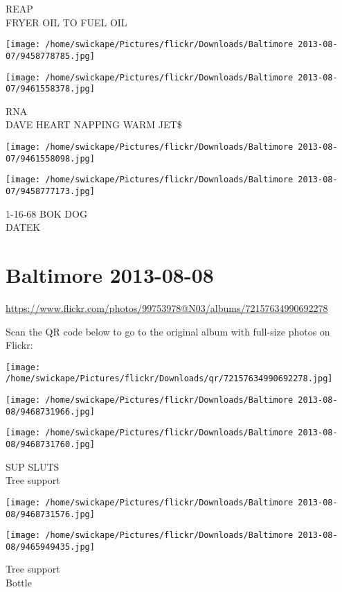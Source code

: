 \documentclass[10pt,letterpaper]{article}
\begin{document}
REAP\\
FRYER OIL TO FUEL OIL
\pagebreak

\texttt{[image: /home/swickape/Pictures/flickr/Downloads/Baltimore 2013-08-07/9458778785.jpg]}

\vspace{0.25in}
\texttt{[image: /home/swickape/Pictures/flickr/Downloads/Baltimore 2013-08-07/9461558378.jpg]}

RNA\\
DAVE HEART NAPPING WARM JET\$
\pagebreak

\texttt{[image: /home/swickape/Pictures/flickr/Downloads/Baltimore 2013-08-07/9461558098.jpg]}

\vspace{0.25in}
\texttt{[image: /home/swickape/Pictures/flickr/Downloads/Baltimore 2013-08-07/9458777173.jpg]}

1{-}16{-}68 BOK DOG\\
DATEK
\pagebreak

\section*{Baltimore 2013-08-08}

\url{https://www.flickr.com/photos/99753978@N03/albums/72157634990692278}

Scan the QR code below to go to the original album with full-size photos on Flickr:

\texttt{[image: /home/swickape/Pictures/flickr/Downloads/qr/72157634990692278.jpg]}
\pagebreak

\texttt{[image: /home/swickape/Pictures/flickr/Downloads/Baltimore 2013-08-08/9468731966.jpg]}

\vspace{0.25in}
\texttt{[image: /home/swickape/Pictures/flickr/Downloads/Baltimore 2013-08-08/9468731760.jpg]}

SUP SLUTS\\
Tree support
\pagebreak

\texttt{[image: /home/swickape/Pictures/flickr/Downloads/Baltimore 2013-08-08/9468731576.jpg]}

\vspace{0.25in}
\texttt{[image: /home/swickape/Pictures/flickr/Downloads/Baltimore 2013-08-08/9465949435.jpg]}

Tree support\\
Bottle
\pagebreak
\end{document}
